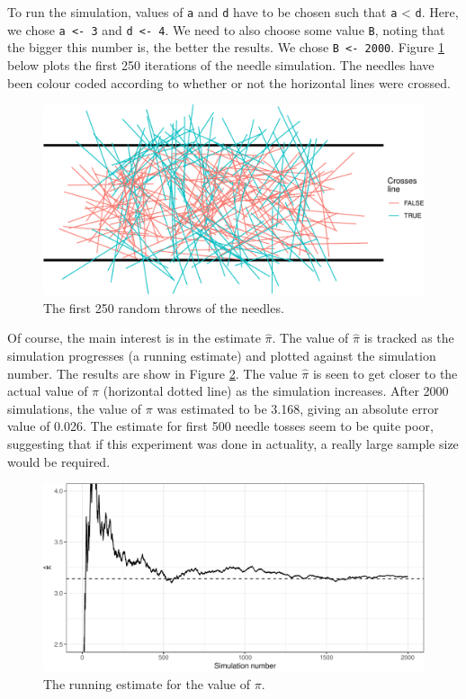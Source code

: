 \documentclass[11pt]{article}
\begin{document}
To run the simulation, values of \texttt{a} and \texttt{d} have to be chosen such that \texttt{a} \textless{} \texttt{d}. 
Here, we chose \texttt{a\ \textless{}-\ 3} and \texttt{d\ \textless{}-\ 4}. 
We need to also choose some value \texttt{B}, noting that the bigger this number is, the better the results. 
We chose \texttt{B\ \textless{}-\ 2000}.
Figure \ref{fig:sim2} below plots the first 250 iterations of the needle
simulation. 
The needles have been colour coded according to whether or not the horizontal lines were crossed.

\begin{figure}
\centering 
\includegraphics[width=\linewidth]{figure/sim2-1}
\caption{The first 250 random throws of the needles.}
\label{fig:sim2}
\end{figure}

Of course, the main interest is in the estimate \(\hat\pi\). 
The value of \(\hat\pi\) is tracked as the simulation progresses (a running estimate) and plotted against the simulation number. The results are show in Figure \ref{fig:sim3}. 
The value \(\hat\pi\) is seen to get closer to the actual value of \(\pi\) (horizontal dotted line) as the simulation increases. 
After 2000 simulations, the value of \(\pi\) was estimated to be 3.168, giving an absolute error value of 0.026. 
The estimate for first 500 needle tosses seem to be quite poor, suggesting that if this experiment was done in actuality, a really large sample size would be required.

\begin{figure}
\centering 
\includegraphics[width=\linewidth]{figure/sim3-1} 
\caption{The running estimate for the value of $\pi$.}
\label{fig:sim3}
\end{figure}
\end{document}
